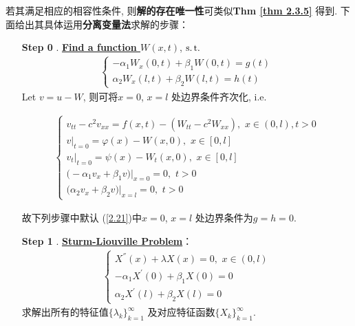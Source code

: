	\vspace*{2em}

	\hspace*{-1.95em}若其满足相应的相容性条件, 则\textbf{解的存在唯一性}可类似\textbf{Thm \ref{thm 2.3.5}} 得到. 下面给出其具体运用\textbf{分离变量法}求解的步骤：
	
	\vspace*{4em}
	
	\begin{enumerate}
		\item[\textbf{Step 0}]. \underline{\textbf{Find a function $W(x , t)$}}, $\operatorname{s.t.}$
		\begin{align*}
			\begin{cases}
				-\alpha_1 W_x(0 , t) + \beta_1 W(0 , t) = g(t) \\
				\alpha_2 W_x(l , t) + \beta_2 W(l , t) = h(t)
			\end{cases}
		\end{align*}
		Let $v = u - W$, 则可将$x = 0$, $x = l$ 处边界条件齐次化, i.e. 
		
		\begin{align*}
			\begin{cases}
				v_{tt} - c^2 v_{xx} = f(x , t) - (W_{tt} - c^2 W_{xx}) , \,\, x \in (0 , l) , t > 0 \\
				v \Big|_{t = 0} = \varphi(x) - W(x , 0) , \,\, x \in [0 , l]\\
				v_t \Big|_{t = 0} = \psi(x) - W_t(x , 0) , \,\, x \in [0 , l] \\
				\Big( -\alpha_1 v_x + \beta_1 v \Big) \Big|_{x = 0} = 0 , \,\, t > 0 \\
				\Big( \alpha_2 v_x + \beta_2 v \Big) \Big|_{x = l} = 0 , \,\, t > 0
			\end{cases}
		\end{align*}
		
		\vspace*{2em}
		
		\hspace*{-1.95em}故下列步骤中默认 (\ref{2.21})中$x = 0$, $x = l$ 处边界条件为$g = h = 0$. 
		
		\vspace*{1em}
		
		\item[\textbf{Step 1}]. \underline{\textbf{Sturm-Liouville Problem}}：
		\begin{align*}
			\begin{cases}
				X^{''}(x) + \lambda X(x) = 0 , \,\, x \in (0 , l) \\
				-\alpha_1 X^{'}(0) + \beta_1 X(0) = 0 \\
				\alpha_2 X^{'}(l) + \beta_2 X(l) = 0
			\end{cases}
		\end{align*}
		求解出所有的特征值$\{ \lambda_k \}_{k = 1}^{\infty}$ 及对应特征函数$\{ X_k \}_{k = 1}^{\infty}$. 
		

\end{enumerate}
